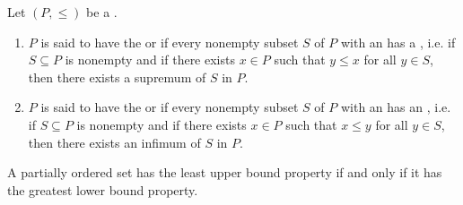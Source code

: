 \begin{definition} \label{definition:least_upper_bound_greatest_lower_bound_property_of_ordered_sets}
    Let $(P, \leq )$ be a .
    \begin{enumerate}
        \item $P$ is said to have the  or  if every nonempty subset $S$ of $P$ with an  has a , i.e. if $S \subseteq P$ is nonempty and if there exists $x \in P$ such that $y \leq x$ for all $y \in S$, then there exists a supremum of $S$ in $P$.

        \item $P$ is said to have the  or  if every nonempty subset $S$ of $P$ with an  has an , i.e. if $S \subseteq P$ is nonempty and if there exists $x \in P$ such that $x \leq y$ for all $y \in S$, then there exists an infimum of $S$ in $P$.
    \end{enumerate}
    A partially ordered set has the least upper bound property if and only if it has the greatest lower bound property.
\end{definition}
